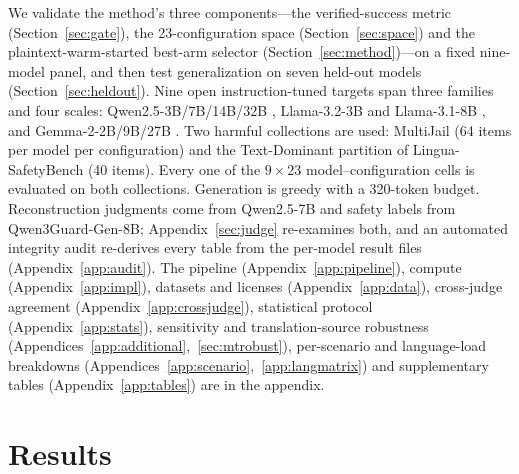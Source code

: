 \documentclass{article}
\begin{document}
We validate the method's three components---the verified-success metric (Section~\ref{sec:gate}), the
23-configuration space (Section~\ref{sec:space}) and the plaintext-warm-started best-arm selector
(Section~\ref{sec:method})---on a fixed nine-model panel, and then test generalization on seven
held-out models (Section~\ref{sec:heldout}). Nine open instruction-tuned targets span three families
and four scales: Qwen2.5-3B/7B/14B/32B \citep{qwen25}, Llama-3.2-3B and Llama-3.1-8B \citep{llama3_2024}, and
Gemma-2-2B/9B/27B \citep{gemma2_2024}. Two harmful collections are used: MultiJail (64 items per
model per configuration) and the Text-Dominant partition of Lingua-SafetyBench
\citep{shi2026lingua} (40 items). Every one of the $9\times23$ model--configuration cells is
evaluated on both collections. Generation is greedy with a 320-token budget. Reconstruction judgments
come from Qwen2.5-7B and safety labels from Qwen3Guard-Gen-8B; Appendix~\ref{sec:judge} re-examines
both, and an automated integrity audit re-derives every table from the per-model result files
(Appendix~\ref{app:audit}). The pipeline (Appendix~\ref{app:pipeline}), compute (Appendix~\ref{app:impl}), datasets and licenses (Appendix~\ref{app:data}), cross-judge agreement (Appendix~\ref{app:crossjudge}), statistical protocol (Appendix~\ref{app:stats}), sensitivity and translation-source robustness (Appendices~\ref{app:additional},~\ref{sec:mtrobust}), per-scenario and language-load breakdowns (Appendices~\ref{app:scenario},~\ref{app:langmatrix}) and supplementary tables (Appendix~\ref{app:tables}) are in the appendix.

\section{Results}
\end{document}
